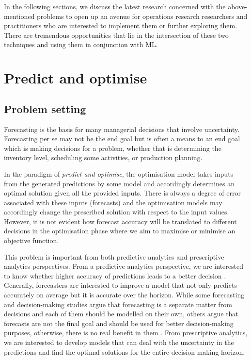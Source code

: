 \documentclass[graybox]{svmult}
\begin{document}
In the following sections, we discuss the latest research concerned with the above-mentioned problems to open up an avenue for operations research researchers and practitioners who are interested to implement them or further exploring them.   There are tremendous opportunities that lie in the intersection of these two techniques and using them in conjunction with ML.


\section{Predict and optimise} \label{sec:predictandopt}

\subsection{Problem setting}\label{sec:problem1}
Forecasting is the basis for many managerial decisions that involve uncertainty. Forecasting per se may not be the end goal but is often a means to an end goal which is making decisions for a problem, whether that is determining the inventory level, scheduling some activities, or production planning. 

In the paradigm of \textit{predict and optimise}, the optimisation model takes inputs from the generated predictions by some model and accordingly determines an optimal solution given all the provided inputs. There is always a degree of error associated with these inputs (forecasts) and the optimisation models may accordingly change the prescribed solution with respect to the input values. However, it is not evident how forecast accuracy will be translated to different decisions in the optimisation phase where we aim to maximise or minimise an objective function.


This problem is important from both predictive analytics and prescriptive analytics perspectives. From a predictive analytics perspective, we are interested to know whether higher accuracy of predictions leads to a better decision \cite{abolghasemi2021state}. Generally, forecasters are interested to improve a model that not only predicts accurately on average but it is accurate over the horizon. While some forecasting and decision-making studies argue that forecasting is a separate matter from decisions and each of them should be modelled on their own, others argue that forecasts are not the final goal and should be used for better decision-making purposes, otherwise, there is no real benefit in them \cite{guo2013multivariate,goodwin2009common}. From prescriptive analytics, we are interested to develop models that can deal with the uncertainty in the predictions and find the optimal solutions for the entire decision-making horizon. 
\end{document}
